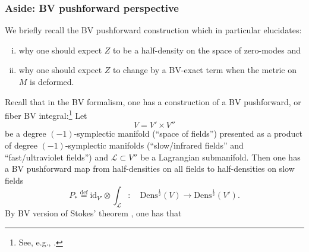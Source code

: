 \documentclass[11pt,a4paper]{amsart}
\theoremstyle{plain} %
\theoremstyle{definition}
\theoremstyle{remark}
\newtheorem{rem}[thm]{Remark}
\newcommand{\mr}{\mathrm}
\newcommand{\ra}{\rightarrow}
\newcommand{\mc}{\mathcal}
\begin{document}
\subsubsection{Aside:  BV pushforward perspective
}

We briefly recall the BV pushforward construction which in particular elucidates: 
\begin{enumerate}[(i)]
    \item why one should expect $Z$ to be a half-density on the space of zero-modes and
    \item why one should expect $Z$ to change by a BV-exact term when the metric on $M$ is deformed.
\end{enumerate}

    Recall that in the BV formalism, one has a construction of a BV pushforward, or fiber BV integral:\footnote{See, e.g., \cite{mnev2019quantum}.} Let 
    \begin{equation}\label{intro V=V'xV''}
    V=V'\times V''
    \end{equation}
    be a degree $(-1)$-symplectic manifold (``space of fields'') presented as a product of degree $(-1)$-symplectic manifolds (``slow/infrared fields'' and ``fast/ultraviolet fields'') and $\mc{L}\subset V''$ be a Lagrangian submanifold. Then one has a BV pushforward map from half-densities on all fields to half-densities on slow fields
    \begin{equation}
        P_* \stackrel{\mr{def}}{=} \mr{id}_{V'}\otimes \int_{\mc{L}}\colon\quad  \mr{Dens}^{\frac12}(V) \ra \mr{Dens}^{\frac12}(V').
    \end{equation}
 By BV version of Stokes' theorem \cite{Schwarz1993}, one has that
\end{document}

